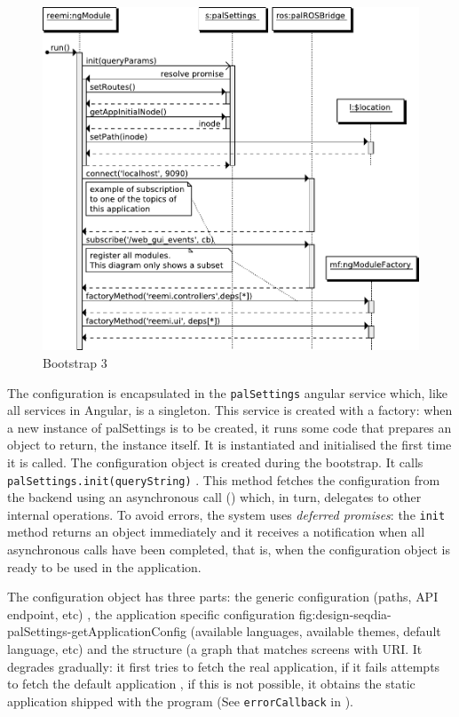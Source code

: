 \begin{figure}[htb]
    \centering
    \includegraphics{figures/design/seqdia/bootstrap-3.pdf}
    \caption{Bootstrap 3}
    \label{fig:design-seqdia-bootstrap-3}
\end{figure}

The configuration is encapsulated in the \texttt{palSettings} angular service which, like all services in Angular, is a singleton.
This service is created with a factory: when a new instance of palSettings is to be created, it runs some code that prepares an object to return, the instance itself.
It is instantiated and initialised the first time it is called.
The configuration object is created during the bootstrap.
It calls \lstinline$palSettings.init(queryString)$ .
This method fetches the configuration from the backend using an asynchronous call () which, in turn, delegates to other internal operations.
To avoid errors, the system uses \emph{deferred promises}: the \texttt{init} method returns an object immediately and it receives a notification when all asynchronous calls have been completed, that is, when the configuration object is ready to be used in the application.

The configuration object has three parts: the generic configuration (paths, \ac{API} endpoint, etc) , the application specific configuration {fig:design-seqdia-palSettings-getApplicationConfig} (available languages, available themes, default language, etc) and the structure  (a graph that matches screens with \ac{URI}.
It degrades gradually: it first tries to fetch the real application, if it fails attempts to fetch the default application , if this is not possible, it obtains the static application shipped with the program (See \texttt{errorCallback} in ).

